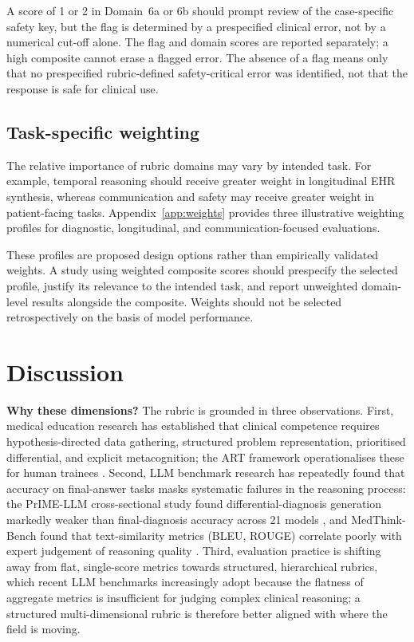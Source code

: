 \documentclass{article}
\begin{document}
A score of 1 or 2 in Domain~6a or 6b should prompt review of the
case-specific safety key, but the flag is determined by a prespecified
clinical error, not by a numerical cut-off alone. The flag and domain
scores are reported separately; a high composite cannot erase a
flagged error. The absence of a flag means only that no prespecified
rubric-defined safety-critical error was identified, not that the
response is safe for clinical use.

\subsection{Task-specific weighting}

The relative importance of rubric domains may vary by intended task.
For example, temporal reasoning should receive greater weight in
longitudinal EHR synthesis, whereas communication and safety may
receive greater weight in patient-facing tasks. Appendix~\ref{app:weights}
provides three illustrative weighting profiles for diagnostic,
longitudinal, and communication-focused evaluations.

These profiles are proposed design options rather than empirically
validated weights. A study using weighted composite scores should
prespecify the selected profile, justify its relevance to the intended
task, and report unweighted domain-level results alongside the composite.
Weights should not be selected retrospectively on the basis of model
performance.

\section{Discussion}

\textbf{Why these dimensions?} The rubric is grounded in three observations. First, medical education research has established that clinical competence requires hypothesis-directed data gathering, structured problem representation, prioritised differential, and explicit metacognition; the ART framework operationalises these for human trainees \cite{thammasitboon2018art}. Second, LLM benchmark research has repeatedly found that accuracy on final-answer tasks masks systematic failures in the reasoning process: the PrIME-LLM cross-sectional study found differential-diagnosis generation markedly weaker than final-diagnosis accuracy across 21 models \cite{rao2026clinicalreasoning}, and MedThink-Bench found that text-similarity metrics (BLEU, ROUGE) correlate poorly with expert judgement of reasoning quality \cite{zhou2026medthinkbench}. Third, evaluation practice is shifting away from flat, single-score metrics towards structured, hierarchical rubrics, which recent LLM benchmarks increasingly adopt because the flatness of aggregate metrics is insufficient for judging complex clinical reasoning; a structured multi-dimensional rubric is therefore better aligned with where the field is moving.
\end{document}
